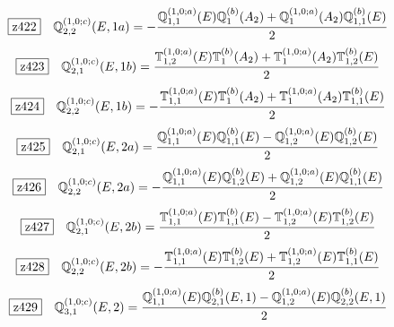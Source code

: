 \documentclass[fleqn,10pt,landscape]{jsarticle}
\begin{document}
\begin{dmath*}
\hspace*{3mm}\fbox{z422}\quad \mathbb{Q}_{2,2}^{(1,0;c)}(E,1a)=- \frac{\mathbb{Q}_{1,1}^{(1,0;a)}(E) \mathbb{Q}_{1}^{(b)}(A_{2}) + \mathbb{Q}_{1}^{(1,0;a)}(A_{2}) \mathbb{Q}_{1,1}^{(b)}(E)}{2}
\end{dmath*}
\begin{dmath*}
\hspace*{3mm}\fbox{z423}\quad \mathbb{Q}_{2,1}^{(1,0;c)}(E,1b)=\frac{\mathbb{T}_{1,2}^{(1,0;a)}(E) \mathbb{T}_{1}^{(b)}(A_{2}) + \mathbb{T}_{1}^{(1,0;a)}(A_{2}) \mathbb{T}_{1,2}^{(b)}(E)}{2}
\end{dmath*}
\begin{dmath*}
\hspace*{3mm}\fbox{z424}\quad \mathbb{Q}_{2,2}^{(1,0;c)}(E,1b)=- \frac{\mathbb{T}_{1,1}^{(1,0;a)}(E) \mathbb{T}_{1}^{(b)}(A_{2}) + \mathbb{T}_{1}^{(1,0;a)}(A_{2}) \mathbb{T}_{1,1}^{(b)}(E)}{2}
\end{dmath*}
\begin{dmath*}
\hspace*{3mm}\fbox{z425}\quad \mathbb{Q}_{2,1}^{(1,0;c)}(E,2a)=\frac{\mathbb{Q}_{1,1}^{(1,0;a)}(E) \mathbb{Q}_{1,1}^{(b)}(E) - \mathbb{Q}_{1,2}^{(1,0;a)}(E) \mathbb{Q}_{1,2}^{(b)}(E)}{2}
\end{dmath*}
\begin{dmath*}
\hspace*{3mm}\fbox{z426}\quad \mathbb{Q}_{2,2}^{(1,0;c)}(E,2a)=- \frac{\mathbb{Q}_{1,1}^{(1,0;a)}(E) \mathbb{Q}_{1,2}^{(b)}(E) + \mathbb{Q}_{1,2}^{(1,0;a)}(E) \mathbb{Q}_{1,1}^{(b)}(E)}{2}
\end{dmath*}
\begin{dmath*}
\hspace*{3mm}\fbox{z427}\quad \mathbb{Q}_{2,1}^{(1,0;c)}(E,2b)=\frac{\mathbb{T}_{1,1}^{(1,0;a)}(E) \mathbb{T}_{1,1}^{(b)}(E) - \mathbb{T}_{1,2}^{(1,0;a)}(E) \mathbb{T}_{1,2}^{(b)}(E)}{2}
\end{dmath*}
\begin{dmath*}
\hspace*{3mm}\fbox{z428}\quad \mathbb{Q}_{2,2}^{(1,0;c)}(E,2b)=- \frac{\mathbb{T}_{1,1}^{(1,0;a)}(E) \mathbb{T}_{1,2}^{(b)}(E) + \mathbb{T}_{1,2}^{(1,0;a)}(E) \mathbb{T}_{1,1}^{(b)}(E)}{2}
\end{dmath*}
\begin{dmath*}
\hspace*{3mm}\fbox{z429}\quad \mathbb{Q}_{3,1}^{(1,0;c)}(E,2)=\frac{\mathbb{Q}_{1,1}^{(1,0;a)}(E) \mathbb{Q}_{2,1}^{(b)}(E,1) - \mathbb{Q}_{1,2}^{(1,0;a)}(E) \mathbb{Q}_{2,2}^{(b)}(E,1)}{2}
\end{dmath*}
\end{document}
